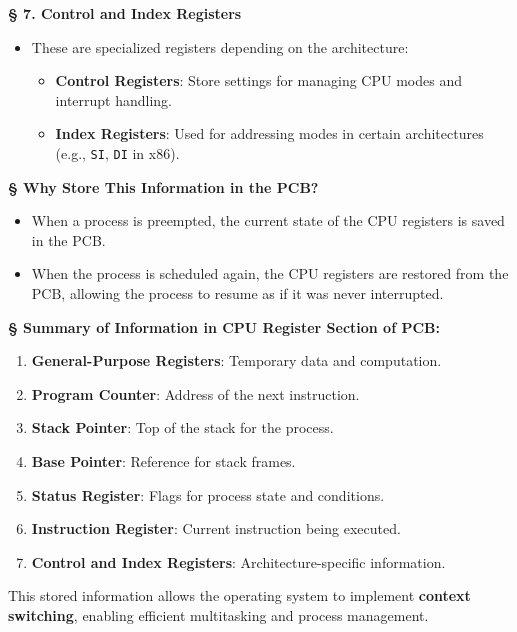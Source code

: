 \documentclass[a4paper]{book}
\newcommand{\sfbf}[1]{{\normalsize\textsf{\textbf{§ #1}}}}
\begin{document}
\sfbf{7. Control and Index Registers}

\begin{itemize}
\item 
These are specialized registers depending on the architecture:
\begin{itemize}
\item 
\textbf{Control Registers}: Store settings for managing CPU modes and interrupt handling.

\item 
\textbf{Index Registers}: Used for addressing modes in certain architectures (e.g., \verb|SI|, \verb|DI| in x86).

\end{itemize}

\end{itemize}

\sfbf{Why Store This Information in the PCB?}

\begin{itemize}
\item 
When a process is preempted, the current state of the CPU registers is saved in the PCB.

\item 
When the process is scheduled again, the CPU registers are restored from the PCB, allowing the process to resume as if it was never interrupted.

\end{itemize}

\sfbf{Summary of Information in CPU Register Section of PCB:}

\begin{enumerate}
\item 
\textbf{General-Purpose Registers}: Temporary data and computation.

\item 
\textbf{Program Counter}: Address of the next instruction.

\item 
\textbf{Stack Pointer}: Top of the stack for the process.

\item 
\textbf{Base Pointer}: Reference for stack frames.

\item 
\textbf{Status Register}: Flags for process state and conditions.

\item 
\textbf{Instruction Register}: Current instruction being executed.

\item 
\textbf{Control and Index Registers}: Architecture-specific information.

\end{enumerate}

This stored information allows the operating system to implement \textbf{context switching}, enabling efficient multitasking and process management.
\end{document}
